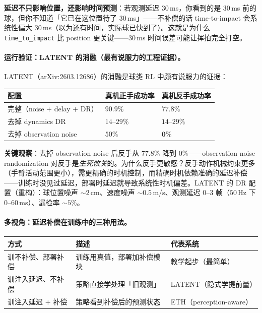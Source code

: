 \textbf{延迟不只影响位置，还影响时间预测}：若观测延迟 $30$\,ms，你看到的是 $30$\,ms 前的球，但你不知道「它已在这位置待了 $30$\,ms」——不补偿的话 time-to-impact 会系统性偏大 $30$\,ms（以为还有时间，实际球已快到了）。这就是为什么 \verb|time_to_impact| 比 position 更关键——$30$\,ms 时间误差可能让挥拍完全打空。

\paragraph{运行验证：LATENT 的消融（最有说服力的工程证据）。}LATENT（arXiv:2603.12686）的消融是球类 RL 中颇有说服力的证据\cite{tennis_latent2026}：

\begin{center}
\small
\begin{tabular}{@{}lll@{}}
\toprule
配置 & 真机正手成功率 & 真机反手成功率 \\
\midrule
完整（noise $+$ delay $+$ DR） & $\mathbf{90.9\%}$ & $\mathbf{77.8\%}$ \\
去掉 dynamics DR & $14$--$29\%$ & $14$--$29\%$ \\
去掉 observation noise & $50\%$ & $\mathbf{0\%}$ \\
\bottomrule
\end{tabular}
\end{center}

\textbf{关键观察}：去掉 observation noise 后反手从 $77.8\%$ 降到 $0\%$——observation noise randomization 对反手是\emph{生死攸关}的。为什么反手更敏感？反手动作机械约束更多（手臂活动范围更小），需更精确的时机控制，而精确时机依赖准确的延迟补偿——训练时没见过延迟，部署时延迟就导致系统性时机偏差。LATENT 的 DR 配置（重构）：球位置噪声 $\sim 2$\,cm、速度噪声 $\sim 0.5$\,m/s、观测延迟 $0$--$3$ 帧（$50$\,Hz 下 $0$--$60$\,ms）、漏检率 $\sim 5\%$。

\paragraph{多视角：延迟补偿在训练中的三种用法。}

\begin{center}
\small
\begin{tabular}{@{}lll@{}}
\toprule
方式 & 描述 & 代表系统 \\
\midrule
训不补偿、部署补偿 & 训练用真值，部署加补偿模块 & 教学起步（最简单） \\
训注入延迟、不补偿 & 策略直接学处理「旧观测」 & LATENT（隐式学提前量）\cite{tennis_latent2026} \\
训注入延迟 $+$ 补偿 & 策略看到补偿后的预测状态 & ETH（perception-aware）\cite{tennis_eth2025badminton} \\
\bottomrule
\end{tabular}
\end{center}

